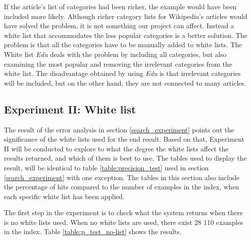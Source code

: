 If the article's list of categories had been richer, the example would have been included more likely. Although richer category lists for Wikipedia's articles would have solved the problem, it is not something our project can affect. Instead a white list that accommodates the less popular categories is a better solution. The problem is that all the categories have to be manually added to white lists. The White list \textit{Edu} deals with the problem by including all categories, but also examining the most popular and removing the irrelevant categories from the white list. The disadvantage obtained by using \textit{Edu} is that irrelevant categories will be included, but on the other hand, they are not connected to many articles. 

\subsection{Experiment II: White list}

The result of the error analysis in section \ref{search_experiment} points out the significance of the white lists used for the end result. Based on that, Experiment II will be conducted to explore to what the degree the white lists affect the results returned, and which of them is best to use. The tables used to display the result, will be identical to table \ref{table:precision_test} used in section \ref{search_experiment} with one exception. The tables in this section also include the percentage of hits compared to the number of examples in the index, when each specific white list has been applied. 

The first step in the experiment is to check what the system returns when there is no white lists used. When no white lists are used, there exist 28 110 examples in the index. Table \ref{table:p_test_no-list} shows the results.

